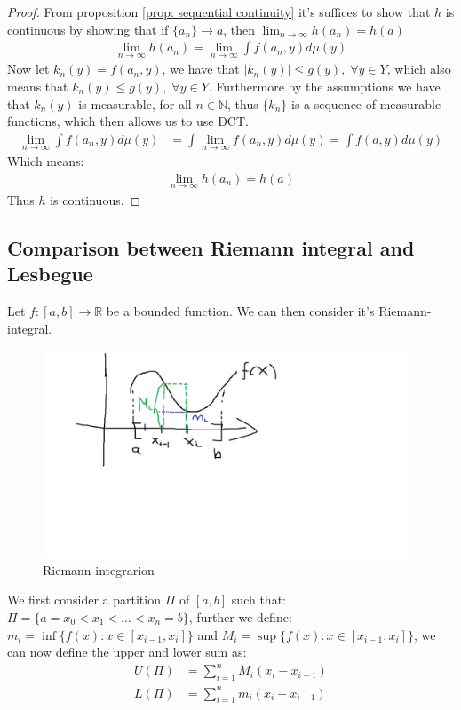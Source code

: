 \documentclass{article}
\newcommand{\R}{\mathbb{R}}
\newcommand{\N}{\mathbb{N}}
\newtheorem{proof}{Proof}
\begin{document}
\begin{proof}
From proposition \ref{prop: sequential continuity} it's suffices to show that $h$ is continuous by showing that if $\{a_{n}\}\to a$, then $\lim_{n\to \infty}h(a_{n}) = h(a)$ 
\begin{align*}
\lim_{n\to \infty}h(a_{n}) = \lim_{n\to \infty} \int f(a_{n},y)d\mu(y)    
\end{align*}
Now let $k_{n}(y) = f(a_{n},y)$, we have that $|k_{n}(y)| \leq g(y), \; \forall y\in Y$, which also means that $k_{n}(y) \leq g(y), \; \forall y\in Y$. Furthermore by the assumptions we have that $k_{n}(y)$ is measurable, for all $n\in \N$, thus $\{k_{n}\}$ is a sequence of measurable functions, which then allows us to use DCT.
\begin{align*}
\lim_{n\to \infty} \int f(a_{n},y)d\mu(y) &= \int \lim_{n\to \infty} f(a_{n},y)d\mu(y) = \int f(a,y)d\mu(y)
\end{align*}
Which means: 
\begin{align*}
\lim_{n\to \infty}h(a_{n}) = h(a)    
\end{align*}
Thus $h$ is continuous.
\end{proof}

\newpage
\subsection{Comparison between Riemann integral and Lesbegue}
Let $f:[a,b]\to \R$ be a bounded function. We can then consider it's Riemann-integral. 

\begin{figure}[h]
\includegraphics[width=11cm]{Riemann-integral.png}
\centering
\caption{Riemann-integrarion}
\label{fig:Riemann-integration}
\end{figure}

We first consider a partition $\Pi$ of $[a,b]$ such that:\\
$\Pi = \{a=x_{0} < x_{1} < \dots < x_{n} = b\}$, further we define:\\ 
$m_{i} = \inf\{f(x): x\in [x_{i-1}, x_{i}]\}$ and 
$M_{i} = \sup \{f(x): x\in [x_{i-1}, x_{i}] \}$, we can now define the upper and lower sum as: 
\begin{align*}
U(\Pi) &= \sum_{i=1}^{n}M_{i}(x_{i}-x_{i-1}) \\ 
L(\Pi) &= \sum_{i=1}^{n}m_{i}(x_{i}-x_{i-1})
\end{align*}
\end{document}
